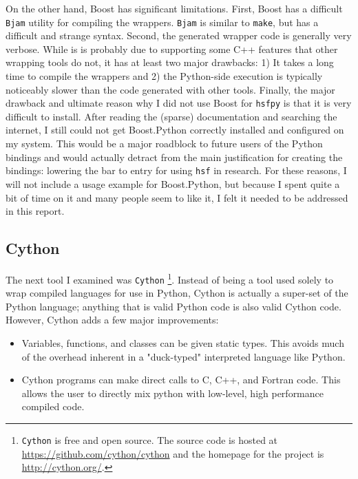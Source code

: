   On the other hand, Boost has significant limitations. First, Boost has a difficult \texttt{Bjam} utility for compiling the wrappers. \texttt{Bjam} is similar to \texttt{make}, but has a difficult and strange syntax. Second, the generated wrapper code is generally very verbose. While is is probably due to supporting some C++ features that other wrapping tools do not, it has at least two major drawbacks: 1) It takes a long time to compile the wrappers and 2) the Python-side execution is typically noticeably slower than the code generated with other tools. Finally, the major drawback and ultimate reason why I did not use Boost for \texttt{hsfpy} is that it is very difficult to install. After reading the (sparse) documentation and searching the internet, I still could not get Boost.Python correctly installed and configured on my system. This would be a major roadblock to future users of the Python bindings and would actually detract from the main justification for creating the bindings: lowering the bar to entry for using \texttt{hsf} in research. For these reasons, I will not include a usage example for Boost.Python, but because I spent quite a bit of time on it and many people seem to like it, I felt it needed to be addressed in this report.

\subsection{Cython} \label{sub:cython}

  The next tool I examined was \texttt{Cython} \footnote{\texttt{Cython} is free and open source. The source code is hosted at \url{https://github.com/cython/cython} and the homepage for the project is \url{http://cython.org/}. }. Instead of being a tool used solely to wrap compiled languages for use in Python, Cython is actually a super-set of the Python language; anything that is valid Python code is also valid Cython code. However, Cython adds a few major improvements:

  \begin{itemize}
    \item Variables, functions, and classes can be given static types. This avoids much of the overhead inherent in a "duck-typed" interpreted language like Python.
    \item Cython programs can make direct calls to C, C++, and Fortran code. This allows the user to directly mix python with low-level, high performance compiled code.
  \end{itemize}

